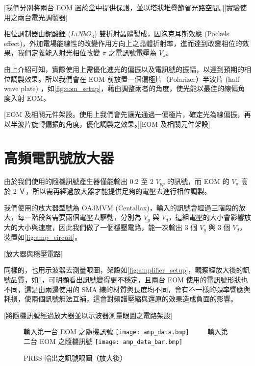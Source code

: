 \documentclass[class=NCU_thesis, crop=false]{standalone}
\begin{document}
[我們分別將兩台 EOM 置於盒中提供保護，並以塔狀堆疊節省光路空間。][實驗使用之兩台電光調製器]

相位調制器由鈮酸鋰 ($LiNbO_{3}$) 雙折射晶體製成，因泡克耳斯效應 (Pockels effect)，外加電場能線性的改變作用方向上之晶體折射率，進而達到改變相位的效果，我們定義能入射光相位改變 $\pi$ 之電訊號電壓為 $V_{\pi}$。

由上介紹可知，實際使用上需優化進光的偏振以及電訊號的振幅，以達到預期的相位調製效果。所以我們會在 EOM 前放置一個偏極片（Polarizer）半波片 (half-wave plate) ，如\cref{fig:eom_setup}，藉由調整兩者的角度，使光能以最佳的線偏角度入射 EOM。

[EOM 及相關元件架設。使用上我們會先讓光通過一偏極片，確定光為線偏振，再以半波片旋轉偏振的角度，優化調製之效果。][EOM 及相關元件架設]

\section{高頻電訊號放大器}

由於我們使用的隨機訊號產生器僅能輸出 0.2 至 2 $V_{pp}$ 的訊號，而 EOM 的 $V_{\pi}$ 高於 2 Ｖ，所以需再經過放大器才能提供足夠的電壓去進行相位調製。

我們使用的放大器型號為 OA3MVM (Centallax)，輸入的訊號會經過三階段的放大，每一階段各需要兩個電壓去驅動，分別為 $V_{g}$ 與 $V_{d}$，這組電壓的大小會影響放大的大小與速度，因此我們做了一個穩壓電路，能一次輸出 3 個 $V_{g}$ 與 3 個 $V_{d}$，裝置如\cref{fig:amp_circuit}。

[放大器與穩壓電路]

同樣的，也用示波器去測量眼圖，架設如\cref{fig:amplifier_setup}，觀察經放大後的訊號品質，如\cref{fig:amp_prbs_eye}，可明顯看出訊號變得更不穩定，且兩台 EOM 使用的電訊號形狀也不同，這是由兩邊使用的 SMA 線的材質與長度均不同，會有不一樣的頻率響應與耗損，使兩個訊號無法互補，這會對頻譜壓縮與還原的效果造成負面的影響。

[將隨機訊號經過放大器並以示波器測量眼圖之電路架設]

\begin{figure}[!hbt]
    \centering
    \subcaptionbox
        {輸入第一台 EOM 之隨機訊號
        \label{fig:subfig_fig1}}
        {\texttt{[image: amp\_data.bmp]}}
    ~~~~
    \subcaptionbox
        {輸入第二台 EOM 之隨機訊號
        \label{fig:subfig_fig2}}
        {\texttt{[image: amp\_data\_bar.bmp]}}
    \caption{PRBS 輸出之訊號眼圖（放大後）}
    \label{fig:amp_prbs_eye}
\end{figure}
\end{document}
